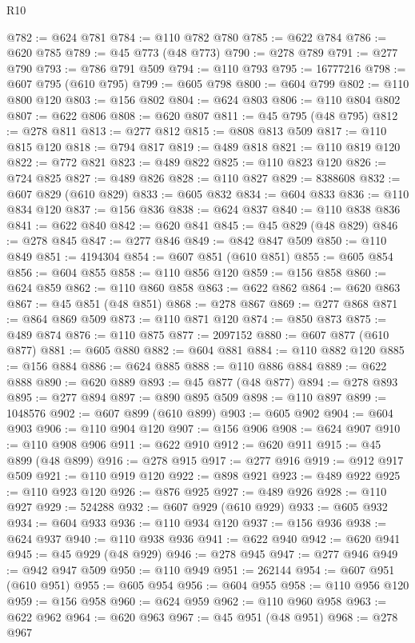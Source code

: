 \begin{lexlean}{R10}
\begin{coremodule}
@782 := @624 @781
@784 := @110 @782 @780
@785 := @622 @784
@786 := @620 @785
@789 := @45 @773 (@48 @773)
@790 := @278 @789
@791 := @277 @790
@793 := @786 @791 @509
@794 := @110 @793
@795 := 16777216
@798 := @607 @795 (@610 @795)
@799 := @605 @798
@800 := @604 @799
@802 := @110 @800 @120
@803 := @156 @802
@804 := @624 @803
@806 := @110 @804 @802
@807 := @622 @806
@808 := @620 @807
@811 := @45 @795 (@48 @795)
@812 := @278 @811
@813 := @277 @812
@815 := @808 @813 @509
@817 := @110 @815 @120
@818 := @794 @817
@819 := @489 @818
@821 := @110 @819 @120
@822 := @772 @821
@823 := @489 @822
@825 := @110 @823 @120
@826 := @724 @825
@827 := @489 @826
@828 := @110 @827
@829 := 8388608
@832 := @607 @829 (@610 @829)
@833 := @605 @832
@834 := @604 @833
@836 := @110 @834 @120
@837 := @156 @836
@838 := @624 @837
@840 := @110 @838 @836
@841 := @622 @840
@842 := @620 @841
@845 := @45 @829 (@48 @829)
@846 := @278 @845
@847 := @277 @846
@849 := @842 @847 @509
@850 := @110 @849
@851 := 4194304
@854 := @607 @851 (@610 @851)
@855 := @605 @854
@856 := @604 @855
@858 := @110 @856 @120
@859 := @156 @858
@860 := @624 @859
@862 := @110 @860 @858
@863 := @622 @862
@864 := @620 @863
@867 := @45 @851 (@48 @851)
@868 := @278 @867
@869 := @277 @868
@871 := @864 @869 @509
@873 := @110 @871 @120
@874 := @850 @873
@875 := @489 @874
@876 := @110 @875
@877 := 2097152
@880 := @607 @877 (@610 @877)
@881 := @605 @880
@882 := @604 @881
@884 := @110 @882 @120
@885 := @156 @884
@886 := @624 @885
@888 := @110 @886 @884
@889 := @622 @888
@890 := @620 @889
@893 := @45 @877 (@48 @877)
@894 := @278 @893
@895 := @277 @894
@897 := @890 @895 @509
@898 := @110 @897
@899 := 1048576
@902 := @607 @899 (@610 @899)
@903 := @605 @902
@904 := @604 @903
@906 := @110 @904 @120
@907 := @156 @906
@908 := @624 @907
@910 := @110 @908 @906
@911 := @622 @910
@912 := @620 @911
@915 := @45 @899 (@48 @899)
@916 := @278 @915
@917 := @277 @916
@919 := @912 @917 @509
@921 := @110 @919 @120
@922 := @898 @921
@923 := @489 @922
@925 := @110 @923 @120
@926 := @876 @925
@927 := @489 @926
@928 := @110 @927
@929 := 524288
@932 := @607 @929 (@610 @929)
@933 := @605 @932
@934 := @604 @933
@936 := @110 @934 @120
@937 := @156 @936
@938 := @624 @937
@940 := @110 @938 @936
@941 := @622 @940
@942 := @620 @941
@945 := @45 @929 (@48 @929)
@946 := @278 @945
@947 := @277 @946
@949 := @942 @947 @509
@950 := @110 @949
@951 := 262144
@954 := @607 @951 (@610 @951)
@955 := @605 @954
@956 := @604 @955
@958 := @110 @956 @120
@959 := @156 @958
@960 := @624 @959
@962 := @110 @960 @958
@963 := @622 @962
@964 := @620 @963
@967 := @45 @951 (@48 @951)
@968 := @278 @967

\end{coremodule}
\end{lexlean}
